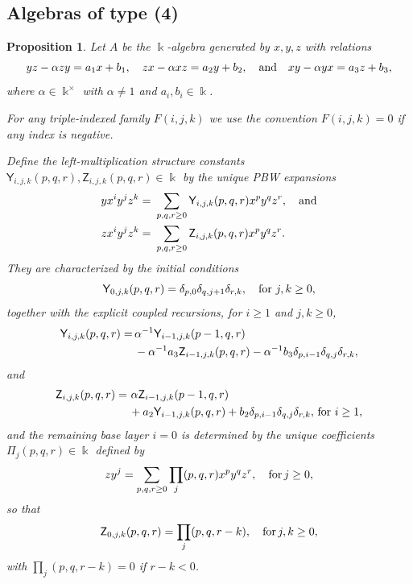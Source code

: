 \documentclass{amsart}
\newtheorem{proposition}[theorem]{Proposition}
\theoremstyle{definition}
\theoremstyle{remark}
\numberwithin{equation}{section}
\begin{document}
\subsection{Algebras of type (4)}

\begin{proposition}\label{Case(4)}
Let $A$ be the $\Bbbk$-algebra generated by $x,y,z$ with relations
\[
yz - \alpha zy = a_1x+b_1, \quad zx - \alpha xz = a_2y + b_2, \quad {\rm and} \quad xy - \alpha yx = a_3z+b_3,
\]
where $\alpha\in\Bbbk^{\times}$ with $\alpha\neq 1$ and $a_i,b_i\in\Bbbk$. 

For any triple-indexed family $F(i,j,k)$ we use the convention $F(i,j,k)=0$ if any index is negative.

Define the left-multiplication structure constants $\mathsf Y_{i,j,k}(p,q,r), \mathsf Z_{i,j,k}(p,q,r)\in\Bbbk$ by the unique PBW expansions
\begin{align}\label{YZstruct4}
    y x^i y^j z^k = &\ \sum_{p,q,r\ge 0}\mathsf Y_{i,j,k}(p,q,r) x^p y^q z^r, \quad {\rm and} \\
    z x^i y^j z^k = &\ \sum_{p,q,r\ge 0}\mathsf Z_{i,j,k}(p,q,r) x^p y^q z^r. \notag
\end{align}
They are characterized by the initial conditions
\begin{equation}\label{Ybase4}
\mathsf Y_{0,j,k}(p,q,r)=\delta_{p,0}\delta_{q,j+1}\delta_{r,k}, \quad {\rm for}\ j, k\ge 0,
\end{equation}
together with the explicit coupled recursions, for $i\ge 1$ and $j,k\ge 0$,
\begin{align}\label{Yrec4}
   \mathsf Y_{i,j,k}(p,q,r) = &\, \alpha^{-1}\mathsf Y_{i-1,j,k}(p-1,q,r) \\
   &\, -\alpha^{-1}a_3\mathsf Z_{i-1,j,k}(p,q,r) -\alpha^{-1}b_3\delta_{p,i - 1}\delta_{q,j}\delta_{r,k}, \notag
\end{align}
and
\begin{align}\label{Zreci4}
\mathsf Z_{i,j,k}(p,q,r) = &\ \alpha\mathsf Z_{i-1,j,k}(p-1,q,r) \\
&\, + a_2\mathsf Y_{i-1,j,k}(p,q,r)+b_2\delta_{p,i-1}\delta_{q,j}\delta_{r,k}, \, {\rm for}\ i\ge 1,  \notag
\end{align}
and the remaining base layer $i=0$ is determined by the unique coefficients $\Pi_j(p,q,r)\in\Bbbk$ defined by
\begin{equation}\label{Pidef4}
zy^j=\sum_{p,q,r\ge 0}\prod_j (p,q,r) x^p y^q z^r, \quad {\rm for}\, j \ge 0,
\end{equation}
so that
\begin{equation}\label{Zbase4}
\mathsf Z_{0,j,k}(p,q,r) = \prod_j(p,q,r-k), \quad {\rm for}\, j, k\ge 0,
\end{equation}
with $\prod_j(p,q,r-k) = 0$ if $r-k<0$.


\end{proposition}
\end{document}
